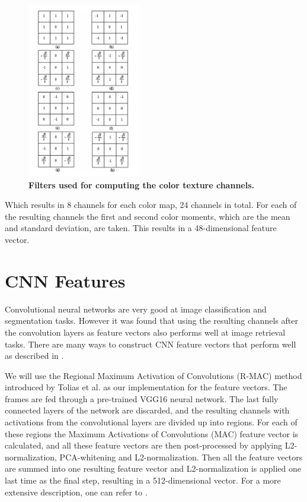 \documentclass{report}
\begin{document}
\begin{figure}[H]
	\includegraphics[width=5cm]{images/filters.png}
	\centering
	\caption{\textbf{Filters used for computing the color texture channels.}}
	\label{fig:filters}
\end{figure}

Which results in 8 channels for each color map, 24 channels in total. For each of the resulting channels the first and second color moments, which are the mean and standard deviation, are taken. This results in a 48-dimensional feature vector.

\section{CNN Features} \label{subsection:cnnfeatures}
Convolutional neural networks are very good at image classification and segmentation tasks. However it was found that using the resulting channels after the convolution layers as feature vectors also performs well at image retrieval tasks. There are many ways to construct CNN feature vectors that perform well as described in \cite{zheng2018sift}.

We will use the Regional Maximum Activation of Convolutions (R-MAC) method introduced by Tolias et al. \cite{tolias2015particular} as our implementation for the feature vectors. The frames are fed through a pre-trained VGG16 neural network. The last fully connected layers of the network are discarded, and the resulting channels with activations from the convolutional layers are divided up into regions. For each of these regions the Maximum Activations of Convolutions (MAC) feature vector is calculated, and all these feature vectors are then post-processed by applying L2-normalization, PCA-whitening and L2-normalization. Then all the feature vectors are summed into one resulting feature vector and L2-normalization is applied one last time as the final step, resulting in a 512-dimensional vector. For a more extensive description, one can refer to \cite{tolias2015particular}.
\end{document}
